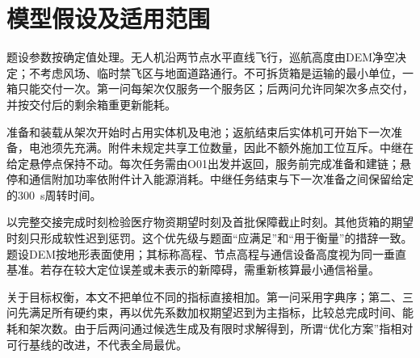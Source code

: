 \section{模型假设及适用范围}

题设参数按确定值处理。无人机沿两节点水平直线飞行，巡航高度由DEM净空决定；不考虑风场、临时禁飞区与地面道路通行。不可拆货箱是运输的最小单位，一箱只能交付一次。第一问每架次仅服务一个服务区；后两问允许同架次多点交付，并按交付后的剩余箱重更新能耗。

准备和装载从架次开始时占用实体机及电池；返航结束后实体机可开始下一次准备，电池须先充满。附件未规定共享工位数量，因此不额外施加工位互斥。中继在给定悬停点保持不动。每次任务需由O01出发并返回，服务前完成准备和建链；悬停和通信附加功率依附件计入能源消耗。中继任务结束与下一次准备之间保留给定的300~s周转时间。

以完整交接完成时刻检验医疗物资期望时刻及首批保障截止时刻。其他货箱的期望时刻只形成软性迟到惩罚。这个优先级与题面“应满足”和“用于衡量”的措辞一致。题设DEM按地形表面使用；其标称高程、节点高程与通信设备高度视为同一垂直基准。若存在较大定位误差或未表示的新障碍，需重新核算最小通信裕量。

关于目标权衡，本文不把单位不同的指标直接相加。第一问采用字典序；第二、三问先满足所有硬约束，再以优先系数加权期望迟到为主指标，比较总完成时间、能耗和架次数。由于后两问通过候选生成及有限时求解得到，所谓“优化方案”指相对可行基线的改进，不代表全局最优。

